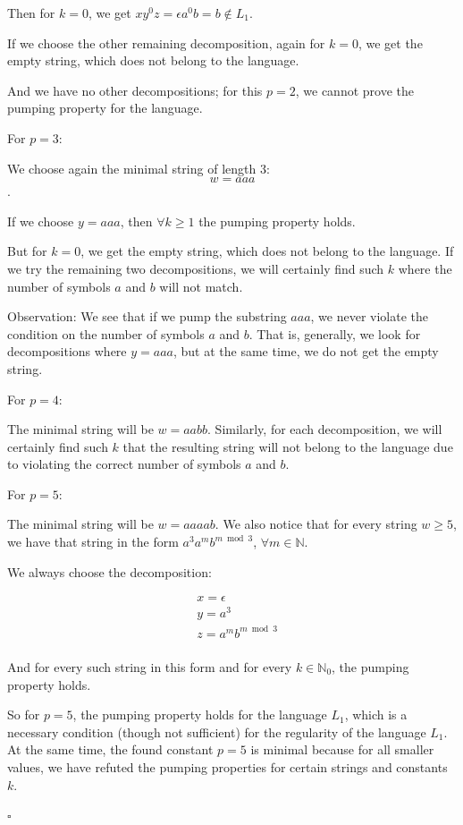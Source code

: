 \documentclass[10pt]{article}
\begin{document}
\begin{description}
Then for $k = 0$, we get $xy^{0}z = \epsilon a^{0} b = b \notin L_1$. 

If we choose the other remaining decomposition, again for $k=0$, we get the empty string, which does not belong to the language. 

And we have no other decompositions; for this $p = 2$, we cannot prove the pumping property for the language.

For $p = 3$:

We choose again the minimal string of length 3: $$w = aaa$$.

If we choose $y = aaa$, then $\forall k \geq 1$ the pumping property holds.

But for $k=0$, we get the empty string, which does not belong to the language. If we try the remaining two decompositions, we will certainly find such $k$ where the number of symbols $a$ and $b$ will not match.

Observation: We see that if we pump the substring $aaa$, we never violate the condition on the number of symbols $a$ and $b$. That is, generally, we look for decompositions where $y = aaa$, but at the same time, we do not get the empty string.

For $p=4$:

The minimal string will be $w = aabb$. Similarly, for each decomposition, we will certainly find such $k$ that the resulting string will not belong to the language due to violating the correct number of symbols $a$ and $b$.

For $p=5$:

The minimal string will be $w = aaaab$. We also notice that for every string $w \geq 5$, we have that string in the form $a^{3}a^{m}b^{m\bmod 3}$, $\forall m \in \mathbb{N}$.

We always choose the decomposition:

\begin{align*}
& x = \epsilon \\
& y = a^{3} \\
& z = a^{m}b^{m\bmod 3} \\
\end{align*}

And for every such string in this form and for every $k \in \mathbb{N}_{0}$, the pumping property holds.

So for $p = 5$, the pumping property holds for the language $L_1$, which is a necessary condition (though not sufficient) for the regularity of the language $L_1$. At the same time, the found constant $p = 5$ is minimal because for all smaller values, we have refuted the pumping properties for certain strings and constants $k$.

\hfill $\square$

\end{description}
\end{document}
